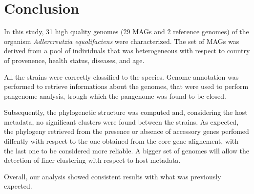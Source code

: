 \clearpage
\section*{Conclusion}

In this study, 31 high quality genomes (29 MAGs and 2 reference genomes)
of the organism \emph{Adlercreutzia equolifaciens} were characterized.
The set of MAGs was derived from a pool of individuals that was heterogeneous
with respect to country of provenence, health status, diseases, and age. 

All the strains were correctly classified to the species. 
Genome annotation was performed to retrieve informations about the genomes, that 
were used to perform pangenome analysis, trough which the pangenome was found to be closed.

Subsequently, the phylogenetic structure was computed and, considering the host metadata,
no significant clusters were found between the strains. As expected, the phylogeny 
retrieved from the presence or absence of accessory genes perfomed diffently with respect
to the one obtained from the core gene alignement, with the last one to be considered
more reliable. A bigger set of genomes will allow the detection of finer clustering with respect
to host metadata.

Overall, our analysis showed consistent results with what was previously expected.







